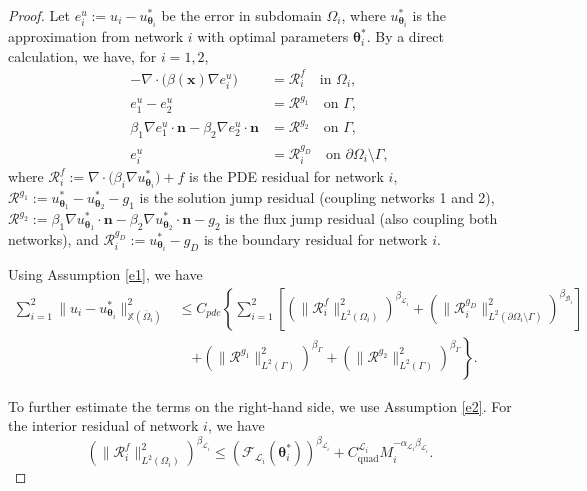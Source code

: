 \documentclass{article}
\newtheorem{proof}{Proof}[section]
\begin{document}
\begin{proof}
Let $e^u_i := u_i - u_{\boldsymbol{\theta}_i}^{*}$ be the error in subdomain $\Omega_i$, where $u_{\boldsymbol{\theta}_i}^{*}$ is the approximation from network $i$ with optimal parameters $\boldsymbol{\theta}_i^*$. By a direct calculation, we have, for $i = 1, 2$,
\begin{equation}
\begin{aligned}
-\nabla \cdot \bigl(\beta(\boldsymbol{x}) \nabla e^u_i\bigr) &= \mathcal{R}^f_i \quad \text{in } \Omega_i, \\
 e^u_1 - e^u_2&= \mathcal{R}^{g_1} \quad \text{on } \Gamma, \\
 \beta_1 \nabla e^u_1 \cdot \boldsymbol{n} - \beta_2 \nabla e^u_2 \cdot \boldsymbol{n}&= \mathcal{R}^{g_2} \quad \text{on } \Gamma, \\
e^u_i &= \mathcal{R}^{g_D}_i \quad \text{on } \partial \Omega_i \setminus \Gamma,
\end{aligned}
\end{equation}
where $\mathcal{R}^f_i := \nabla \cdot \bigl(\beta_i \nabla u_{\boldsymbol{\theta}_i}^{*}\bigr) + f$ is the PDE residual for network $i$, $\mathcal{R}^{g_1} := u_{\boldsymbol{\theta}_1}^{*} - u_{\boldsymbol{\theta}_2}^{*} - g_1$ is the solution jump residual (coupling networks 1 and 2), $\mathcal{R}^{g_2} := \beta_1 \nabla u_{\boldsymbol{\theta}_1}^{*} \cdot \boldsymbol{n} - \beta_2 \nabla u_{\boldsymbol{\theta}_2}^{*} \cdot \boldsymbol{n} - g_2$ is the flux jump residual (also coupling both networks), and $\mathcal{R}^{g_D}_i := u_{\boldsymbol{\theta}_i}^{*} - g_D$ is the boundary residual for network $i$.

Using Assumption \ref{e1}, we have
\begin{equation}
\begin{aligned}
\sum_{i=1}^{2} \|u_i - u_{\boldsymbol{\theta}_i}^{*}\|^2_{\mathbb{X}(\overline{\Omega}_i)} &\leq C_{pde} \left\{ \sum_{i=1}^{2} \left[ \left(\|\mathcal{R}^f_i\|^2_{L^2(\Omega_i)}\right)^{\beta_{\mathcal{L}_i}} + \left(\|\mathcal{R}^{g_D}_i\|^2_{L^2(\partial\Omega_i \setminus \Gamma)}\right)^{\beta_{\mathcal{B}_i}}\right] \right. \\
&\quad \left. + \left(\|\mathcal{R}^{g_1}\|^2_{L^2(\Gamma)}\right)^{\beta_{\Gamma}} + \left(\|\mathcal{R}^{g_2}\|^2_{L^2(\Gamma)}\right)^{\beta_{\Gamma}} \right\}.
\end{aligned}
\end{equation}

To further estimate the terms on the right-hand side, we use Assumption \ref{e2}. For the interior residual of network $i$, we have
\begin{equation}
\left(\|\mathcal{R}^f_i\|^2_{L^2(\Omega_i)}\right)^{\beta_{\mathcal{L}_i}} \leq (\mathcal{F}_{\mathcal{L}_i}(\boldsymbol{\theta}_i^*))^{\beta_{\mathcal{L}_i}} + C_{\text{quad}}^{\mathcal{L}_i}M_{i}^{-\alpha_{\mathcal{L}_i}\beta_{\mathcal{L}_i}}.
\end{equation}


\end{proof}
\end{document}
